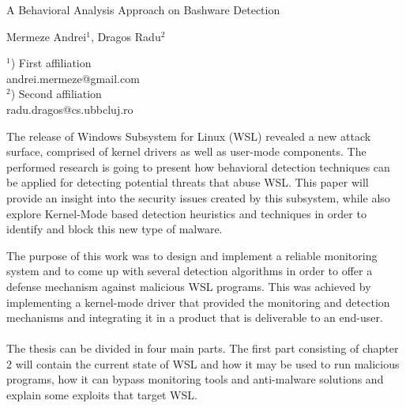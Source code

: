 \documentclass[a4paper]{article}
\begin{document}
    
    \Large
     \begin{center}
        A Behavioral Analysis Approach on Bashware Detection\\ 
    
    \hspace{10pt}
    
    \large
    Mermeze Andrei$^1$, Dragos Radu$^2$ \\
    
    \hspace{10pt}
    
    \small  
    $^1$) First affiliation\\
    andrei.mermeze@gmail.com\\
    $^2$) Second affiliation\\
    radu.dragos@cs.ubbcluj.ro
    \end{center}
    
    \hspace{10pt}
    
    \normalsize

    The release of Windows Subsystem for Linux (WSL) revealed a new attack surface, comprised of kernel drivers as well as user-mode components. The
    performed research is going to present how behavioral detection techniques can be applied for detecting potential threats that abuse
    WSL. This paper will provide an insight into the security issues created by this subsystem, while also explore Kernel-Mode based detection
    heuristics and techniques in order to identify and block this new type of malware.

    The purpose of this work was to design and implement a reliable monitoring system and to come up with several detection algorithms in order
    to offer a defense mechanism against malicious WSL programs. This was achieved by implementing a kernel-mode driver that provided the
    monitoring and detection mechanisms and integrating it in a product that is deliverable to an end-user. 

    \paragraph{}
    The thesis can be divided in four main parts. The first part consisting of chapter 2 will contain the current state of WSL and how it may
    be used to run malicious programs, how it can bypass monitoring tools and anti-malware solutions and explain some exploits that target WSL.
\end{document}

